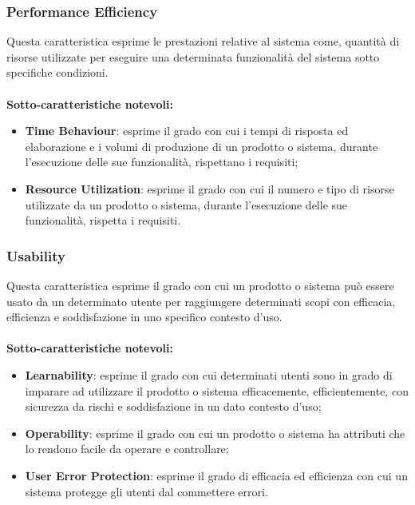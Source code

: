 \subsubsection{Performance Efficiency}
Questa caratteristica esprime le prestazioni relative al sistema come, quantità di risorse utilizzate per eseguire una determinata funzionalità del sistema sotto specifiche condizioni.  \\ \\
\textbf{Sotto-caratteristiche notevoli:}
\begin{itemize}
	\item{\textbf{Time Behaviour}}: esprime il grado con cui i tempi di risposta ed elaborazione e i volumi di produzione di un prodotto o sistema, durante l'esecuzione delle sue funzionalità, rispettano i requisiti;
	\item{\textbf{Resource Utilization}}: esprime il grado con cui il numero e tipo di risorse utilizzate da un prodotto o sistema, durante l'esecuzione delle sue funzionalità, rispetta i requisiti.
\end{itemize}

\subsubsection{Usability}
Questa caratteristica esprime il grado con cui un prodotto o sistema può essere usato da un determinato utente per raggiungere determinati scopi con efficacia, efficienza e soddisfazione in uno specifico contesto d'uso.\\ \\
\textbf{Sotto-caratteristiche notevoli:}
\begin{itemize}
	\item{\textbf{Learnability}}: esprime il grado con cui determinati utenti sono in grado di imparare ad utilizzare il prodotto o sistema efficacemente, efficientemente, con sicurezza da rischi e soddisfazione in un dato contesto d'uso;
	\item{\textbf{Operability}}: esprime il grado con cui un prodotto o sistema ha attributi che lo rendono facile da operare e controllare;
	\item{\textbf{User Error Protection}}: esprime il grado di efficacia ed efficienza con cui un sistema protegge gli utenti dal commettere errori.
\end{itemize}

